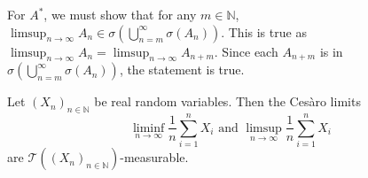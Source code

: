 \vspace{1mm}
For $A^*$, we must show that for any $m\in\mathbb{N}$, $\limsup_{n\to\infty}A_n \in \sigma(\bigcup_{n=m}^\infty \sigma(A_n))$. This is true as $\limsup_{n\to\infty}A_n=\limsup_{n\to\infty}A_{n+m}$. Since each $A_{n+m}$ is in $\sigma(\bigcup_{n=m}^\infty \sigma(A_{n}))$, the statement is true.

\vspace{2mm}
Let $(X_n)_{n\in\mathbb{N}}$ be real random variables. Then the Ces\`{a}ro limits
$$\liminf_{n\to\infty} \frac{1}{n}\sum_{i=1}^n X_i\text{ and }\limsup_{n\to\infty} \frac{1}{n}\sum_{i=1}^n X_i$$
are $\mathcal{T}((X_n)_{n\in\mathbb{N}})$-measurable.


